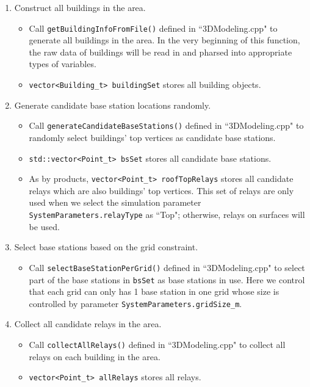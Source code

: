 \documentclass[paper=a4, fontsize=11pt]{scrartcl}
\numberwithin{equation}{section}		%
\numberwithin{figure}{section}			%
\numberwithin{table}{section}				%
\begin{document}
\begin{enumerate}
	\item Construct all buildings in the area.
	\begin{itemize}
		\item Call \verb|getBuildingInfoFromFile()| defined in ``3DModeling.cpp" to generate all buildings in the area. In the very beginning of this function, the raw data of buildings will be read in and pharsed into appropriate types of variables.
		\item \verb|vector<Building_t> buildingSet| stores all building objects.
	\end{itemize}
	
	\item Generate candidate base station locations randomly.
	\begin{itemize}
		\item Call \verb|generateCandidateBaseStations()| defined in ``3DModeling.cpp" to randomly select buildings' top vertices as candidate base stations.
		\item \verb|std::vector<Point_t> bsSet| stores all candidate base stations.
		\item As by products, \verb|vector<Point_t> roofTopRelays| stores all candidate relays which are also buildings' top vertices. This set of relays are only used when we select the simulation parameter \verb|SystemParameters.relayType| as ``Top"; otherwise, relays on surfaces will be used.
	\end{itemize}
	
	\item Select base stations based on the grid constraint.
	\begin{itemize}
		\item Call \verb|selectBaseStationPerGrid()| defined in ``3DModeling.cpp" to select part of the base stations in \verb|bsSet| as base stations in use. Here we control that each grid can only has 1 base station in one grid whose size is controlled by parameter \verb|SystemParameters.gridSize_m|.
	\end{itemize}
	
	\item Collect all candidate relays in the area.
	\begin{itemize}
		\item Call \verb|collectAllRelays()| defined in ``3DModeling.cpp" to collect all relays on each building in the area.
		\item \verb|vector<Point_t> allRelays| stores all relays.
	\end{itemize}
	

\end{enumerate}
\end{document}
